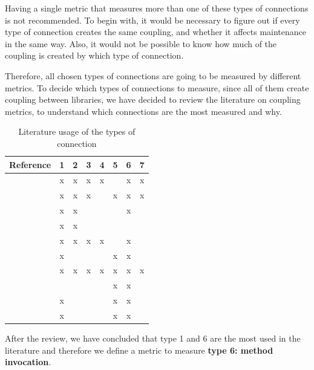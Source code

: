 \documentclass[a4paper]{article}
\begin{document}
Having a single metric that measures more than one of these types of connections is not recommended. To begin with, it would be necessary to figure out if every type of connection creates the same coupling, and whether it affects maintenance in the same way. Also, it would not be possible to know how much of the coupling is created by which type of connection.

Therefore, all chosen types of connections are going to be measured by different metrics. To decide which types of connections to measure, since all of them create coupling between libraries, we have decided to review the literature on coupling metrics, to understand which connections are the most measured and why.

\begin{table}[ht!]
    \centering
    \begin{tabular}{|l|c|c|c|c|c|c|c|}
         \hline
         Reference                      & 1 & 2 & 3 & 4 & 5 & 6 & 7 \\\hline
         \cite{eder1994coupling}        & x & x & x & x &   & x & x \\\hline
         \cite{hitz1995measuring}       & x & x & x &   & x & x & x \\\hline
         \cite{briand1997investigation} & x & x &   &   &   & x &   \\\hline
         \cite{wilkie2000coupling}      & x & x &   &   &   &   &   \\\hline
         \cite{yang2005detecting}       & x & x & x & x &   & x &   \\\hline
         \cite{gui2007ranking}          & x &   &   &   & x & x &   \\\hline
         \cite{gupta2009package}        & x & x & x & x & x & x & x \\\hline
         \cite{harrison1998coupling}    &   &   &   &   & x & x &   \\\hline
         \cite{du2004refactoring}       & x &   &   &   & x & x &   \\\hline
         \cite{koetter2019assessing}    & x &   &   &   & x & x &   \\\hline
    \end{tabular}
    \caption{Literature usage of the types of connection}
    \label{tab:type-con-literature}
\end{table}

 After the review, we have concluded that type 1 and 6 are the most used in the literature and therefore we define a metric to measure \textbf{type 6: method invocation}.
\end{document}
